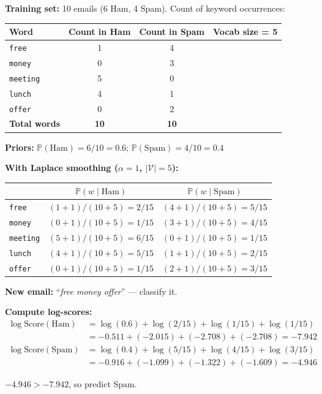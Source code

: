 \documentclass[12pt,a4paper]{article}
\newcommand{\Prob}{\mathbb{P}}
\begin{document}
\begin{tcolorbox}[exbox, title={Example 2: Na\"{i}ve Bayes for Spam Detection}]
\textbf{Training set:} 10 emails (6 Ham, 4 Spam). Count of keyword occurrences:

\medskip
\begin{center}
\begin{tabular}{lccc}
\toprule
\textbf{Word} & \textbf{Count in Ham} & \textbf{Count in Spam} & \textbf{Vocab size = 5} \\
\midrule
\texttt{free}    & 1 & 4 \\
\texttt{money}   & 0 & 3 \\
\texttt{meeting} & 5 & 0 \\
\texttt{lunch}   & 4 & 1 \\
\texttt{offer}   & 0 & 2 \\
\midrule
\textbf{Total words} & \textbf{10} & \textbf{10} \\
\bottomrule
\end{tabular}
\end{center}

\medskip
\textbf{Priors:} $\Prob(\text{Ham}) = 6/10 = 0.6$; $\Prob(\text{Spam}) = 4/10 = 0.4$

\medskip
\textbf{With Laplace smoothing ($\alpha=1$, $|\mathcal{V}|=5$):}

\medskip
\begin{center}
\begin{tabular}{lcc}
\toprule
& $\Prob(w \mid \text{Ham})$ & $\Prob(w \mid \text{Spam})$ \\
\midrule
\texttt{free}    & $(1+1)/(10+5) = 2/15$ & $(4+1)/(10+5) = 5/15$ \\
\texttt{money}   & $(0+1)/(10+5) = 1/15$ & $(3+1)/(10+5) = 4/15$ \\
\texttt{meeting} & $(5+1)/(10+5) = 6/15$ & $(0+1)/(10+5) = 1/15$ \\
\texttt{lunch}   & $(4+1)/(10+5) = 5/15$ & $(1+1)/(10+5) = 2/15$ \\
\texttt{offer}   & $(0+1)/(10+5) = 1/15$ & $(2+1)/(10+5) = 3/15$ \\
\bottomrule
\end{tabular}
\end{center}

\medskip
\textbf{New email:} ``\textit{free money offer}'' — classify it.

\medskip
\textbf{Compute log-scores:}
\begin{align*}
  \log\text{Score}(\text{Ham}) &= \log(0.6) + \log(2/15) + \log(1/15) + \log(1/15)\\
  &= -0.511 + (-2.015) + (-2.708) + (-2.708) = -7.942\\[4pt]
  \log\text{Score}(\text{Spam}) &= \log(0.4) + \log(5/15) + \log(4/15) + \log(3/15)\\
  &= -0.916 + (-1.099) + (-1.322) + (-1.609) = -4.946
\end{align*}

$-4.946 > -7.942$, so predict $\boxed{\text{Spam}}$.
\end{tcolorbox}
\end{document}
